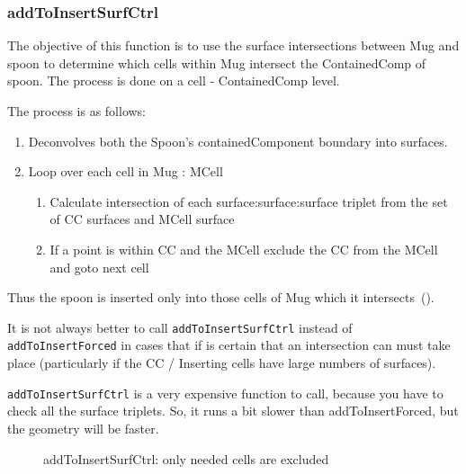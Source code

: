 \subsubsection{addToInsertSurfCtrl}

The objective of this function is to use the surface intersections between Mug and spoon to determine which 
cells within Mug intersect the ContainedComp of spoon. The process is done on a cell - ContainedComp level. 

The process is as follows:
\begin{enumerate}

\item{Deconvolves both the Spoon's containedComponent boundary into surfaces.}
\item{Loop over each cell in Mug : MCell}
  \begin{enumerate}
  \item{Calculate intersection of each surface:surface:surface triplet from the set of CC surfaces and MCell surface}
  \item{If a point is within CC and the MCell exclude the CC from the
    MCell and goto next cell}
  \end{enumerate}
\end{enumerate}
   
Thus the spoon is inserted only into those cells of Mug which it intersects~().

It is not always better to call {\tt addToInsertSurfCtrl} instead of
{\tt addToInsertForced} in cases that if is certain that an
intersection can must take place (particularly if the CC / Inserting
cells have large numbers of surfaces).

{\tt addToInsertSurfCtrl} is a very expensive function to call,
because you have to check all the surface triplets. So, it runs a bit
slower than addToInsertForced, but the geometry will be faster.

\begin{figure}
  \centering
   \quad
  \caption{addToInsertSurfCtrl: only needed cells are excluded}
  \label{fig:surfctrl}
\end{figure}


